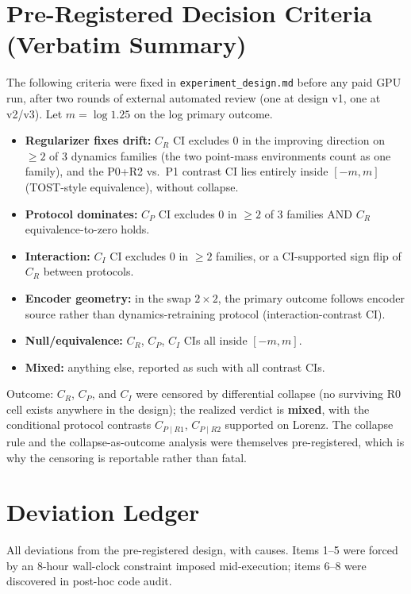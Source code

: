 \section{Pre-Registered Decision Criteria (Verbatim Summary)}
\label{app:prereg}

The following criteria were fixed in \texttt{experiment\_design.md} before any paid GPU run, after two rounds of external automated review (one at design v1, one at v2/v3). Let $m=\log 1.25$ on the log primary outcome.

\begin{itemize}
\item \textbf{Regularizer fixes drift:} $C_R$ CI excludes 0 in the improving direction on $\geq 2$ of 3 dynamics families (the two point-mass environments count as one family), and the P0+R2 vs.\ P1 contrast CI lies entirely inside $[-m,m]$ (TOST-style equivalence), without collapse.
\item \textbf{Protocol dominates:} $C_P$ CI excludes 0 in $\geq 2$ of 3 families AND $C_R$ equivalence-to-zero holds.
\item \textbf{Interaction:} $C_I$ CI excludes 0 in $\geq 2$ families, or a CI-supported sign flip of $C_R$ between protocols.
\item \textbf{Encoder geometry:} in the swap $2{\times}2$, the primary outcome follows encoder source rather than dynamics-retraining protocol (interaction-contrast CI).
\item \textbf{Null/equivalence:} $C_R$, $C_P$, $C_I$ CIs all inside $[-m,m]$.
\item \textbf{Mixed:} anything else, reported as such with all contrast CIs.
\end{itemize}

Outcome: $C_R$, $C_P$, and $C_I$ were censored by differential collapse (no surviving R0 cell exists anywhere in the design); the realized verdict is \textbf{mixed}, with the conditional protocol contrasts $C_{P\mid R1}$, $C_{P\mid R2}$ supported on Lorenz. The collapse rule and the collapse-as-outcome analysis were themselves pre-registered, which is why the censoring is reportable rather than fatal.

\section{Deviation Ledger}
\label{app:deviations}

All deviations from the pre-registered design, with causes. Items 1--5 were forced by an 8-hour wall-clock constraint imposed mid-execution; items 6--8 were discovered in post-hoc code audit.

